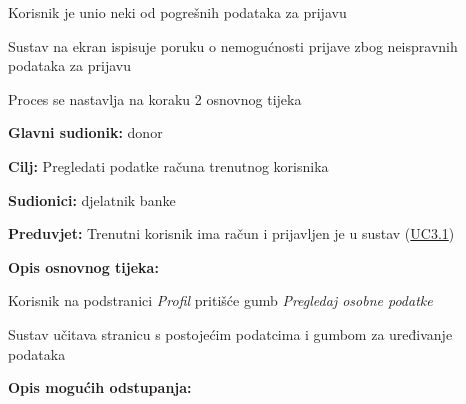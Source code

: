 \begin{packed_item}
\begin{packed_enum}
	                        \item[4.b] Korisnik je unio neki od pogrešnih podataka za prijavu
	                        \item[] \begin{packed_enum}
    	                        \item Sustav na ekran ispisuje poruku o nemogućnosti prijave zbog neispravnih podataka za prijavu
    	                        \item Proces se nastavlja na koraku 2 osnovnog tijeka
					    	\end{packed_enum}
						\end{packed_enum}
						
					\end{packed_item}
					
						
					\noindent {}
					\begin{packed_item}  \label{UC4}
	
						\item \textbf{Glavni sudionik: }donor
						\item  \textbf{Cilj:} Pregledati podatke računa trenutnog korisnika
						\item  \textbf{Sudionici:} djelatnik banke
						\item  \textbf{Preduvjet:} Trenutni korisnik ima račun i prijavljen je u sustav (\hyperref[UC3.1]{UC3.1})
						\item  \textbf{Opis osnovnog tijeka:}
						
						\item[] \begin{packed_enum}
	
	                        \item Korisnik na podstranici \textit{Profil} pritišće gumb \textit{Pregledaj osobne podatke}
	                        \item Sustav učitava stranicu s postojećim podatcima i gumbom za uređivanje podataka

						\end{packed_enum}
						
						\item  \textbf{Opis mogućih odstupanja:}

						
					\end{packed_item}
					
